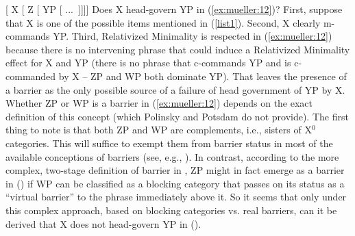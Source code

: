 \documentclass[output=paper
,modfonts
,nonflat]{langsci/langscibook}
\begin{document}
	\ea\label{ex:mueller:12} {[} X [ \label{vcp}Z [ YP [ ...~]]]] \z
	Does X head-govern YP in (\ref{ex:mueller:12})? First, suppose that X is one of the
	possible items mentioned in (\ref{list1}). Second, X clearly m-commands
	YP. Third, Relativized Minimality is respected in (\ref{ex:mueller:12}) because there
	is no intervening phrase that could induce a Relativized Minimality
	effect for X and YP (there is no phrase that c-commands YP and is
	c-commanded by X -- ZP and WP both dominate YP). That leaves the
	presence of a barrier as the only possible source of a failure of
	head government of YP by X. Whether ZP or WP is a barrier in (\ref{ex:mueller:12})
	depends on the exact definition of this concept (which Polinsky and
	Potsdam do not provide). The first thing to note is that both ZP and
	WP are complements, i.e., sisters of X$^0$ categories. This will
	suffice to exempt them from barrier status in most of the available
	conceptions of barriers (see, e.g., \citealt{Cinque:90}). In contrast,
	according to the more complex, two-stage definition of barrier in
	\cite{Chomsky:86}, ZP might in fact emerge as a barrier in (\Last) if WP
	can be classified as a blocking category that passes on its status as
	a ``virtual barrier'' to the phrase immediately above it. So it seems
	that only under this complex approach, based on blocking categories
	vs. real barriers, can it be derived that X does not head-govern YP in
	(\Last). 
	
\end{document}
